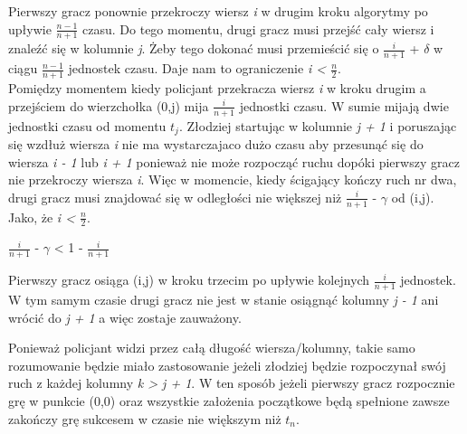 \documentclass[brudnopis]{xmgr}
\begin{document}
\indent Pierwszy gracz ponownie przekroczy wiersz \textit{i} w drugim kroku algorytmy po upływie $\frac{n-1}{n+1}$ czasu. Do tego momentu, drugi gracz musi przejść cały wiersz i znaleźć się w kolumnie \textit{j}. Żeby tego dokonać musi przemieścić się o $\frac{i}{n+1}$ + $\delta$ w ciągu $\frac{n-1}{n+1}$ jednostek czasu. Daje nam to ograniczenie \textit{i < $\frac{n}{2}$}.
\\\indent Pomiędzy momentem kiedy policjant przekracza wiersz \textit{i} w kroku drugim a przejściem do wierzchołka (0,j) mija $\frac{i}{n+1}$ jednostki czasu. W sumie mijają dwie jednostki czasu od momentu $t_j$. Złodziej startując w kolumnie \textit{j + 1} i poruszając się wzdłuż wiersza \textit{i} nie ma wystarczajaco dużo czasu aby przesunąć się do wiersza \textit{i - 1} lub \textit{i + 1} ponieważ nie może rozpocząć ruchu dopóki pierwszy gracz nie przekroczy wiersza \textit{i}. Więc w momencie, kiedy ścigający kończy ruch nr dwa, drugi gracz musi znajdować się w odległości nie większej niż $\frac{i}{n+1}$ - $\gamma$ od (i,j). Jako, że \textit{i < $\frac{n}{2}$}.
\begin{center}
$\frac{i}{n+1}$ - $\gamma$ < 1 - $\frac{i}{n+1}$
\end{center}
\indent Pierwszy gracz osiąga (i,j) w kroku trzecim po upływie kolejnych $\frac{i}{n+1}$ jednostek. W tym samym czasie drugi gracz nie jest w stanie osiągnąć kolumny \textit{j - 1} ani wrócić do \textit{j + 1} a więc zostaje zauważony.

\indent Ponieważ policjant widzi przez całą długość wiersza/kolumny, takie samo rozumowanie będzie miało zastosowanie jeżeli złodziej będzie rozpoczynał swój ruch z każdej kolumny \textit{k > j + 1}. W ten sposób jeżeli pierwszy gracz rozpocznie grę w punkcie (0,0) oraz wszystkie założenia początkowe będą spełnione zawsze zakończy grę sukcesem w czasie nie większym niż \textit{$t_n$}.


\end{document}
